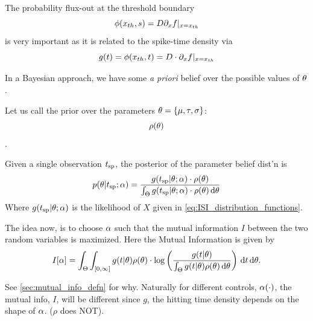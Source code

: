 \documentclass{article}
\begin{document}
The probability flux-out at the threshold boundary $$\phi({ x_{th} }, s) = D
{\partial}_xf |_{x={ x_{th} }}$$ is very important as it is related to the spike-time density
via $$g( t)  = \phi({ x_{th} }, t) = D\cdot {\partial}_x f|_{x={ x_{th} }}$$
 
% 
% 
% 

In a Bayesian approach, we have some {\sl a priori} belief over the possible
values of ${\theta}$.

Let us call the prior over the parameters ${\theta} = \{{\mu }, { \tau }, {\sigma }\}$:
$$\rho({\theta})$$.

Given a single observation ${ t_{\textrm{sp} } }$, the posterior of the parameter belief dist'n
is 
\begin{equation}
p({\theta}| { t_{\textrm{sp} } }; {\alpha}) =
\frac{g({ t_{\textrm{sp} } } |{\theta}; {\alpha})\cdot \rho({\theta})}{\int_\Theta g({ t_{\textrm{sp} } }|{\theta}; {\alpha})\cdot \rho({\theta})
\, \mathrm{d} {\theta}}
\label{eq:parameter_posterior_defn}
\end{equation} 
Where $ g( { t_{\textrm{sp} } } |{\theta}; {\alpha})$ is the likelihood of $X$ given in
\cref{eq:ISI_distribution_functions}.

The idea now, is to choose ${\alpha}$ such that the mutual information $I$ between the
two random variables is maximized. Here the Mutual Information is given by
\begin{equation}
I[{\alpha}]= 
\int_\Theta \int_{[0, \infty]} g(t|{\theta})\rho({\theta}) \cdot 
\log \left( \frac{g(t|{\theta})}
{\int_\Theta g(t|{\theta})\rho({\theta}) \, \mathrm{d} {\theta}   } \right)
\, \mathrm{d} t\, \mathrm{d} {\theta}.
\label{eq:J_mutual_info_objective}
\end{equation}

See \cref{sec:mutual_info_defn} for why. 
Naturally for different controls, ${\alpha}(\cdot)$, the mutual info, $I$, will
be different since $g$, the hitting time density depends on the shape of ${\alpha}$.
($\rho$ does NOT).
\end{document}
